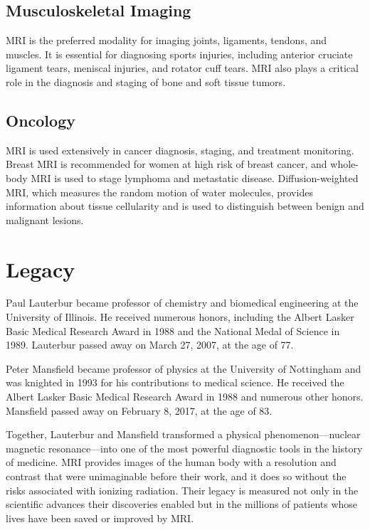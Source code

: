 \subsection{Musculoskeletal Imaging}

MRI is the preferred modality for imaging joints, ligaments, tendons, and muscles. It is essential for diagnosing sports injuries, including anterior cruciate ligament tears, meniscal injuries, and rotator cuff tears. MRI also plays a critical role in the diagnosis and staging of bone and soft tissue tumors.

\subsection{Oncology}

MRI is used extensively in cancer diagnosis, staging, and treatment monitoring. Breast MRI is recommended for women at high risk of breast cancer, and whole-body MRI is used to stage lymphoma and metastatic disease. Diffusion-weighted MRI, which measures the random motion of water molecules, provides information about tissue cellularity and is used to distinguish between benign and malignant lesions.

\section{Legacy}

Paul Lauterbur became professor of chemistry and biomedical engineering at the University of Illinois. He received numerous honors, including the Albert Lasker Basic Medical Research Award in 1988 and the National Medal of Science in 1989. Lauterbur passed away on March 27, 2007, at the age of 77.

Peter Mansfield became professor of physics at the University of Nottingham and was knighted in 1993 for his contributions to medical science. He received the Albert Lasker Basic Medical Research Award in 1988 and numerous other honors. Mansfield passed away on February 8, 2017, at the age of 83.

Together, Lauterbur and Mansfield transformed a physical phenomenon---nuclear magnetic resonance---into one of the most powerful diagnostic tools in the history of medicine. MRI provides images of the human body with a resolution and contrast that were unimaginable before their work, and it does so without the risks associated with ionizing radiation. Their legacy is measured not only in the scientific advances their discoveries enabled but in the millions of patients whose lives have been saved or improved by MRI.


